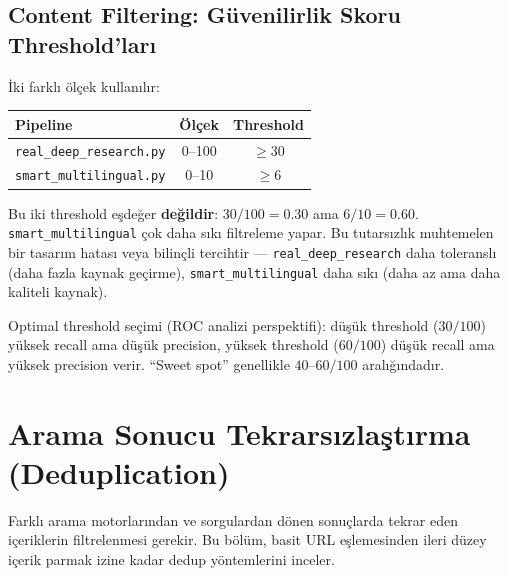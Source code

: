 \subsection{Content Filtering: G\"{u}venilirlik Skoru Threshold'lar{\i}}
\label{subsec:content-filtering}

\.{I}ki farkl{\i} \"{o}l\c{c}ek kullan{\i}l{\i}r:

\begin{center}
\begin{tabular}{lcc}
\toprule
\color{chapterBlue}\textbf{Pipeline} &
\color{chapterBlue}\textbf{\"{O}l\c{c}ek} &
\color{chapterBlue}\textbf{Threshold} \\
\midrule
\texttt{real\_deep\_research.py} & 0--100 & $\geq 30$ \\
\texttt{smart\_multilingual.py}  & 0--10  & $\geq 6$ \\
\bottomrule
\end{tabular}
\end{center}

\begin{dikkat}
Bu iki threshold e\c{s}de\u{g}er \textbf{de\u{g}ildir}: $30/100 = 0.30$ ama $6/10 = 0.60$. \texttt{smart\_multilingual} \c{c}ok daha s{\i}k{\i} filtreleme yapar. Bu tutars{\i}zl{\i}k muhtemelen bir tasar{\i}m hatas{\i} veya bilin\c{c}li tercihtir --- \texttt{real\_deep\_research} daha toleransl{\i} (daha fazla kaynak ge\c{c}irme), \texttt{smart\_multilingual} daha s{\i}k{\i} (daha az ama daha kaliteli kaynak).
\end{dikkat}

\noindent
Optimal threshold se\c{c}imi (ROC analizi perspektifi): d\"{u}\c{s}\"{u}k threshold ($30/100$) y\"{u}ksek recall ama d\"{u}\c{s}\"{u}k precision, y\"{u}ksek threshold ($60/100$) d\"{u}\c{s}\"{u}k recall ama y\"{u}ksek precision verir. ``Sweet spot'' genellikle $40\text{--}60/100$ aral{\i}\u{g}{\i}ndad{\i}r.


\section{Arama Sonucu Tekrars{\i}zla\c{s}t{\i}rma (Deduplication)}
\label{sec:deduplication}

Farkl{\i} arama motorlar{\i}ndan ve sorgulardan d\"{o}nen sonu\c{c}larda tekrar eden i\c{c}eriklerin filtrelenmesi gerekir. Bu b\"{o}l\"{u}m, basit URL e\c{s}lemesinden ileri d\"{u}zey i\c{c}erik parmak izine kadar dedup y\"{o}ntemlerini inceler.

